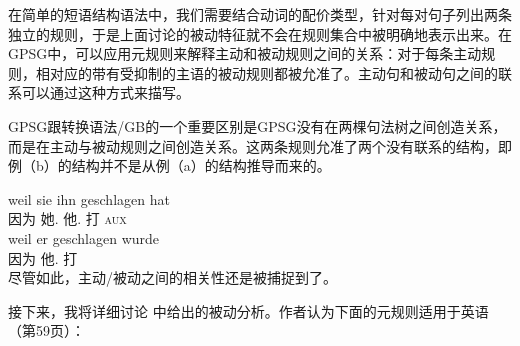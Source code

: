 \noindent
在简单的短语结构语法中，我们需要结合动词的配价类型，针对每对句子列出两条独立的规则，于是上面讨论的被动特征就不会在规则集合中被明确地表示出来。在GPSG中，可以应用元规则来解释主动和被动规则之间的关系：对于每条主动规则，相对应的带有受抑制的主语的被动规则都被允准了。主动句和被动句之间的联系可以通过这种方式来描写。

GPSG跟转换语法/GB\indexgb\indexmp 的一个重要区别是GPSG没有在两棵句法树之间创造关系，而是在主动与被动规则之间创造关系。这两条规则允准了两个没有联系的结构，即例（b）的结构并不是从例（a）的结构推导而来的。

\eal
\ex 
\gll weil sie ihn geschlagen hat\\
     因为 她.\nom{} 他.\acc{} 打 \textsc{aux}\\
\ex 
\gll weil er geschlagen wurde\\
     因为 他.\nom{} 打 \passivepst\\
\zl
%
尽管如此，主动/被动之间的相关性还是被捕捉到了。

接下来，我将详细讨论 中给出的被动分析。作者认为下面的元规则适用于英语（第59页）：

